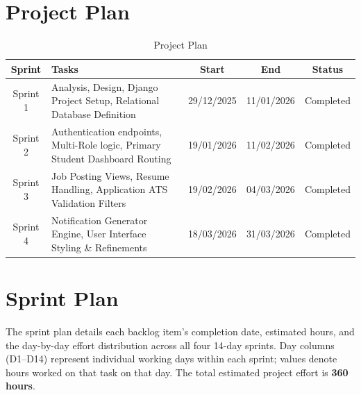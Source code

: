 \documentclass[a4paper,12pt]{report}
\begin{document}
\section{Project Plan}

\begin{table}[H]
\centering
\caption{Project Plan}
\label{tab:projectplan}
\renewcommand{\arraystretch}{1.3}
\begin{tabular}{|c|>{\centering\arraybackslash}p{6cm}|c|c|c|}
\hline
\textbf{Sprint} & \textbf{Tasks} & \textbf{Start} & \textbf{End} & \textbf{Status} \\
\hline
Sprint 1 & Analysis, Design, Django Project Setup, Relational Database Definition & 29/12/2025 & 11/01/2026 & Completed \\
\hline
Sprint 2 & Authentication endpoints, Multi-Role logic, Primary Student Dashboard Routing & 19/01/2026 & 11/02/2026 & Completed \\
\hline
Sprint 3 & Job Posting Views, Resume Handling, Application ATS Validation Filters & 19/02/2026 & 04/03/2026 & Completed \\
\hline
Sprint 4 & Notification Generator Engine, User Interface Styling \& Refinements & 18/03/2026 & 31/03/2026 & Completed \\
\hline
\end{tabular}
\end{table}


\section{Sprint Plan}

The sprint plan details each backlog item's completion date, estimated hours, and the day-by-day effort distribution across all four 14-day sprints. Day columns (D1--D14) represent individual working days within each sprint; values denote hours worked on that task on that day. The total estimated project effort is \textbf{360 hours}.
\end{document}
